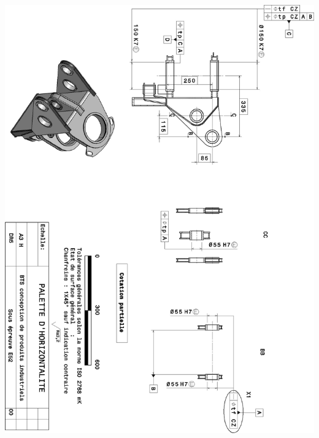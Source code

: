 \documentclass[10pt,fleqn]{article} %
\begin{document}
\begin{center}

{\includegraphics[width=\linewidth]{images/fig_03}}
\end{center}
\end{document}
